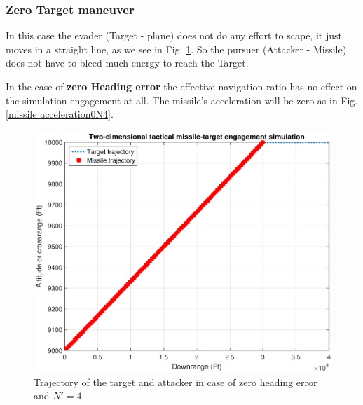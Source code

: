 \subsubsection{Zero Target maneuver}
In this case the evader (Target - plane) does not do any effort to scape, it just moves in a straight line, as we see in Fig. \ref{trajectory0N4}. So the pursuer (Attacker - Missile) does not have to bleed much energy to reach the Target.

In the case of \textbf{zero Heading error} the effective navigation ratio has no effect on the simulation engagement at all. The missile's acceleration will be zero as in Fig. \ref{missile acceleration0N4}.

\begin{figure}[htb]
	\centering
	\includegraphics[scale = 0.75]{fig/trajectory0N4.pdf}
	\caption{Trajectory of the target and attacker in case of zero heading error and $N'=4$.}
	\label{trajectory0N4}
\end{figure}


